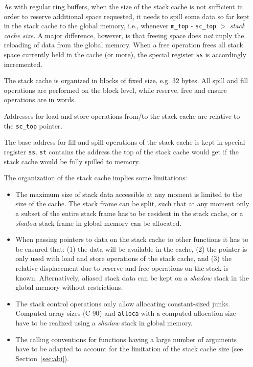 \documentclass[a4paper,fontsize=10pt,twoside,DIV15,BCOR12mm,headinclude=true,footinclude=false,pagesize,bibtotoc]{scrbook}
\newcommand{\code}[1]{{\texttt{#1}}}
\newcommand{\comment}[3]{

\textsf{\textbf{#1}} {\color{#3}#2}}
\newcommand{\martin}[1]{\comment{Martin}{#1}{Blue}}
\renewcommand{\martin}[1]{}
\begin{document}
\martin{We might update this section with more content from the S\$ paper}

As with regular ring buffers, when the size of the stack cache is not sufficient
in order to reserve additional space requested, it needs to spill some data
so far kept in the stack cache to the global memory, i.e., whenever
\code{m\_top} - \code{sc\_top} $>$ \emph{stack cache size}. A major difference,
however, is that freeing space does \emph{not} imply the reloading of data from
the global memory. When a free operation frees all stack space currently held in
the cache (or more), the special register \texttt{ss} is accordingly
incremented.

The stack cache is organized in blocks of fixed size, e.g. $32$ bytes. All
spill and fill operations are performed on the block level, while reserve, free
and ensure operations are in words.
\martin{We agreed that some size values are needed in the compiler to
generate correct code (soon). So we might bring in stack cache manipulation
in burst blocks as well.}

Addresses for load and store operations from/to the stack cache are relative to
the \code{sc\_top} pointer.

The base address for fill and spill operations of the stack cache is kept in
special register \texttt{ss}. \texttt{st} contains the address the top of the
stack cache would get if the stack cache would be fully spilled to memory.

The organization of the stack cache implies some limitations:
\begin{itemize}
  \item The maximum size of stack data accessible at any moment is limited to
        the size of the cache. The stack frame can be split, such that at any
        moment only a subset of the entire stack frame has to be resident in the
        stack cache, or a \emph{shadow} stack frame in global memory can be
        allocated.
  \item When passing pointers to data on the stack cache to other functions it
        has to be ensured that: (1) the data will be available in the cache, (2)
        the pointer is only used  with load and store operations of the stack
        cache, and (3) the relative displacement due to reserve and free
        operations on the stack is known. Alternatively, aliased stack data can
        be kept on a \emph{shadow} stack in the global memory without
        restrictions.
  \item The stack control operations only allow allocating constant-sized junks.
        Computed array sizes (C 90) and \texttt{alloca} with a computed
        allocation size have to be realized using a \emph{shadow} stack in
        global memory.
  \item The calling conventions for functions having a large number of arguments
        have to be adapted to account for the limitation of the stack cache
        size (see Section~\ref{sec:abi}).
\end{itemize}
\end{document}
